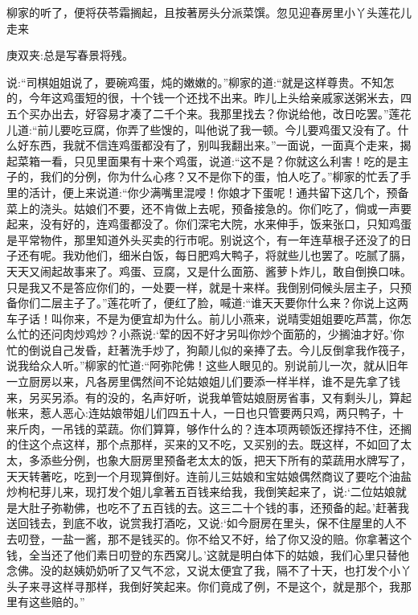 \begin{parag}
    柳家的听了，便将茯苓霜搁起，且按著房头分派菜馔。忽见迎春房里小丫头莲花儿走来\begin{note}庚双夹:总是写春景将残。\end{note}说:“司棋姐姐说了，要碗鸡蛋，炖的嫩嫩的。”柳家的道:“就是这样尊贵。不知怎的，今年这鸡蛋短的很，十个钱一个还找不出来。昨儿上头给亲戚家送粥米去，四五个买办出去，好容易才凑了二千个来。我那里找去？你说给他，改日吃罢。”莲花儿道:“前儿要吃豆腐，你弄了些馊的，叫他说了我一顿。今儿要鸡蛋又没有了。什么好东西，我就不信连鸡蛋都没有了，别叫我翻出来。”一面说，一面真个走来，揭起菜箱一看，只见里面果有十来个鸡蛋，说道:“这不是？你就这么利害！吃的是主子的，我们的分例，你为什么心疼？又不是你下的蛋，怕人吃了。”柳家的忙丢了手里的活计，便上来说道:“你少满嘴里混唚！你娘才下蛋呢！通共留下这几个，预备菜上的浇头。姑娘们不要，还不肯做上去呢，预备接急的。你们吃了，倘或一声要起来，没有好的，连鸡蛋都没了。你们深宅大院，水来伸手，饭来张口，只知鸡蛋是平常物件，那里知道外头买卖的行市呢。别说这个，有一年连草根子还没了的日子还有呢。我劝他们，细米白饭，每日肥鸡大鸭子，将就些儿也罢了。吃腻了膈，天天又闹起故事来了。鸡蛋、豆腐，又是什么面筋、酱萝卜炸儿，敢自倒换口味。只是我又不是答应你们的，一处要一样，就是十来样。我倒别伺候头层主子，只预备你们二层主子了。”莲花听了，便红了脸，喊道:“谁天天要你什么来？你说上这两车子话！叫你来，不是为便宜却为什么。前儿小燕来，说晴雯姐姐要吃芦蒿，你怎么忙的还问肉炒鸡炒？小燕说:‘荤的因不好才另叫你炒个面筋的，少搁油才好。’你忙的倒说自己发昏，赶著洗手炒了，狗颠儿似的亲捧了去。今儿反倒拿我作筏子，说我给众人听。”柳家的忙道:“阿弥陀佛！这些人眼见的。别说前儿一次，就从旧年一立厨房以来，凡各房里偶然间不论姑娘姐儿们要添一样半样，谁不是先拿了钱来，另买另添。有的没的，名声好听，说我单管姑娘厨房省事，又有剩头儿，算起帐来，惹人恶心:连姑娘带姐儿们四五十人，一日也只管要两只鸡，两只鸭子，十来斤肉，一吊钱的菜蔬。你们算算，够作什么的？连本项两顿饭还撑持不住，还搁的住这个点这样，那个点那样，买来的又不吃，又买别的去。既这样，不如回了太太，多添些分例，也象大厨房里预备老太太的饭，把天下所有的菜蔬用水牌写了，天天转著吃，吃到一个月现算倒好。连前儿三姑娘和宝姑娘偶然商议了要吃个油盐炒枸杞芽儿来，现打发个姐儿拿著五百钱来给我，我倒笑起来了，说:‘二位姑娘就是大肚子弥勒佛，也吃不了五百钱的去。这三二十个钱的事，还预备的起。’赶著我送回钱去，到底不收，说赏我打酒吃，又说:‘如今厨房在里头，保不住屋里的人不去叨登，一盐一酱，那不是钱买的。你不给又不好，给了你又没的赔。你拿著这个钱，全当还了他们素日叨登的东西窝儿。’这就是明白体下的姑娘，我们心里只替他念佛。没的赵姨奶奶听了又气不忿，又说太便宜了我，隔不了十天，也打发个小丫头子来寻这样寻那样，我倒好笑起来。你们竟成了例，不是这个，就是那个，我那里有这些赔的。”
\end{parag}


